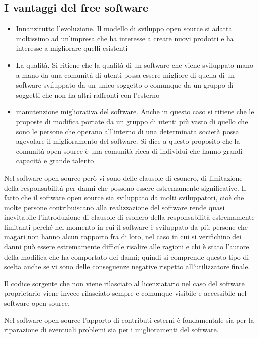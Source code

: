 \subsection{I vantaggi del free software}
\begin{itemize}
    \item Innanzitutto l'evoluzione. Il modello di sviluppo open source si adatta moltissimo ad un'impresa che ha interesse a creare nuovi prodotti e ha interesse a migliorare quelli esistenti
    \item La qualità. Si ritiene che la qualità di un software che viene sviluppato mano a mano da una comunità di utenti possa essere migliore di quella di un software sviluppato da un unico soggetto o comunque da un gruppo di soggetti che non ha altri raffronti con l'esterno
    \item manutenzione migliorativa del software. Anche in questo caso si ritiene che le proposte di modifica portate da un gruppo di utenti più vasto di quello che sono le persone che operano all'interno di una determinata società possa agevolare il miglioramento del software. Si dice a questo proposito che la comunità open source è una comunità ricca di individui che hanno grandi capacità e grande talento
\end{itemize}

Nel software open source però vi sono delle clausole di esonero, di limitazione della responsabilità per danni che possono essere estremamente significative. Il fatto che il software open source sia sviluppato da molti sviluppatori, cioè che molte persone contribuiscano alla realizzazione del software rende quasi inevitabile l'introduzione di clausole di esonero della responsabilità estremamente limitanti perché nel momento in cui il software è sviluppato da più persone che magari non hanno alcun rapporto fra di loro, nel caso in cui si verifichino dei danni può essere estremamente difficile risalire alle ragioni e chi è stato l'autore della modifica che ha comportato dei danni; quindi si comprende questo tipo di scelta anche se vi sono delle conseguenze negative rispetto all'utilizzatore finale. 

Il codice sorgente che non viene rilasciato al licenziatario nel caso del software proprietario viene invece rilasciato sempre e comunque visibile e accessibile nel software open source. 

Nel software open source l'apporto di contributi esterni è fondamentale sia per la riparazione di eventuali problemi sia per i miglioramenti del software. 

